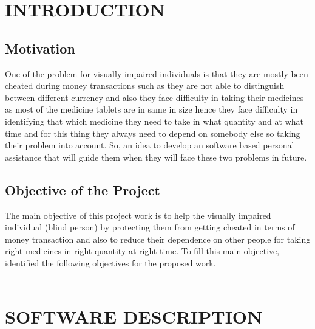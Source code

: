 \chapter{INTRODUCTION}
\label{chap:intro}
\section{Motivation}
One of the problem for visually impaired individuals is that they are mostly been cheated during money transactions such as they are not able to distinguish between different currency and also they face difficulty in taking their medicines as most of the medicine tablets are in same in size hence they face difficulty in identifying that which medicine they need to take in what quantity and at what time and for this thing they always need to depend on somebody else so taking their problem into account. So, an idea to develop an software based personal assistance that will guide them when they will face these two problems in future.
\section{Objective of the Project}
The main objective of this project work is to help the visually impaired individual (blind person) by protecting them from getting cheated in terms of money transaction and also to reduce their dependence on other people for taking right medicines in right quantity at right time. To fill this main objective, identified the following objectives for the proposed work.\\
\\
\newpage
\chapter{SOFTWARE DESCRIPTION}
